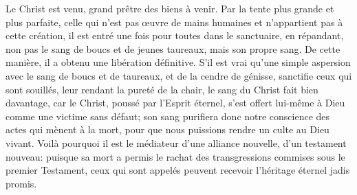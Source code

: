 Le Christ est venu, grand prêtre des biens à venir.
	Par la tente plus grande et plus parfaite,
	celle qui n’est pas œuvre de mains humaines
		et n’appartient pas à cette création,
	il est entré une fois pour toutes dans le sanctuaire,
	en répandant, non pas le sang de boucs et de jeunes taureaux,
	mais son propre sang.
De cette manière, il a obtenu une libération définitive.
S’il est vrai qu’une simple aspersion avec le sang de boucs et de taureaux,
		et de la cendre de génisse,
	sanctifie ceux qui sont souillés, leur rendant la pureté de la chair,
	le sang du Christ fait bien davantage,
	car le Christ, poussé par l’Esprit éternel,
	s’est offert lui-même à Dieu comme une victime sans défaut;
	son sang purifiera donc notre conscience des actes qui mènent à la mort,
	pour que nous puissions rendre un culte au Dieu vivant.
Voilà pourquoi il est le médiateur d’une alliance nouvelle,
		d’un testament nouveau:
	puisque sa mort a permis le rachat
		des transgressions commises sous le premier Testament,
	ceux qui sont appelés peuvent recevoir l’héritage éternel jadis promis.
